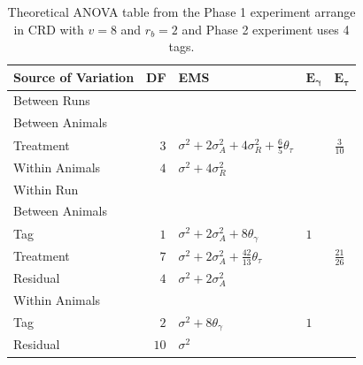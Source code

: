 \documentclass[12pt,a4paper]{article}
\begin{document}
\begin{table}[ht]
\centering
 \caption{Theoretical ANOVA table from the Phase 1 experiment arrange in CRD with $v = 8$ and $r_b = 2$ and Phase 2 experiment uses 4 tags.}
 \begin{tabular}[t]{lrlll} 
 \toprule 
 \multicolumn{1}{l}{\textbf{Source of Variation}} & \multicolumn{1}{l}{\textbf{DF}} & \multicolumn{1}{l}{\textbf{EMS}}& \multicolumn{1}{l}{$\bm{E_{\gamma}}$}&\multicolumn{1}{l}{$\bm{E_{\tau}}$}\\ 
 \midrule 
 Between Runs &  &  & & \\ 
 \quad Between Animals &  &  & & \\ 
 \quad \quad Treatment & $3$ & $\sigma^2+2\sigma_{A}^2+4\sigma_{R}^2+\frac{6}{5}\theta_{\tau}$ & & $\frac{3}{10}$\\ 
 \quad Within Animals & $4$ & $\sigma^2+4\sigma_{R}^2$ & & \\ \hline 
 Within Run &  &  & & \\ 
 \quad Between Animals &  &  & & \\ 
 \quad \quad Tag & $1$ & $\sigma^2+2\sigma_{A}^2+8\theta_{\gamma}$ &$1$ & \\ 
 \quad \quad Treatment & $7$ & $\sigma^2+2\sigma_{A}^2+\frac{42}{13}\theta_{\tau}$ & & $\frac{21}{26}$\\ 
 \quad \quad Residual & $4$ & $\sigma^2+2\sigma_{A}^2$ & & \\ \hline 
 \quad Within Animals &  &  & & \\ 
 \quad \quad Tag & $2$ & $\sigma^2+8\theta_{\gamma}$ &$1$ & \\ 
 \quad \quad Residual & $10$ & $\sigma^2$ & & \\ 
 \bottomrule 
 \end{tabular} 
 \label{tab:ANOVAPhaseCRD31} 
\end{table} 
\end{document}
